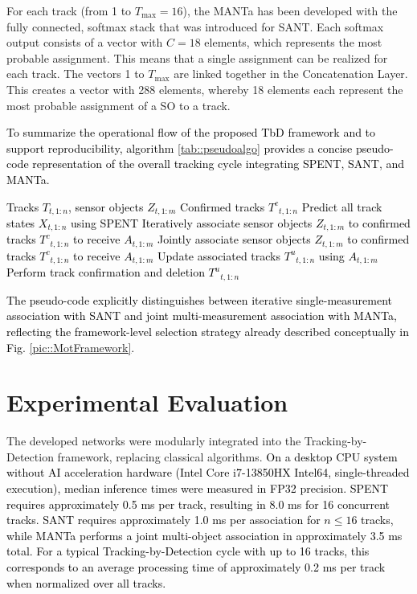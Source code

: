 \documentclass[letterpaper, 10 pt, journal, twoside]{IEEEtran}
\newcommand{\red}[1]{\textcolor{black}{#1}}
\begin{document}
For each track (from 1 to $T_{\max}=16$), the MANTa has been developed with the fully connected, softmax stack that was introduced for \ac{SANT}.
Each softmax output consists of a vector with $C=18$ elements, which represents the most probable assignment.
This means that a single assignment can be realized for each track.
The vectors 1 to $T_{\max}$ are linked together in the Concatenation Layer.
This creates a vector with 288 elements, whereby 18 elements each represent the most probable assignment of a \ac{SO} to a track.

\red{To summarize the operational flow of the proposed \ac{TbD} framework and to support reproducibility, algorithm {\ref{tab::pseudoalgo}} provides a concise pseudo-code representation of the overall tracking cycle integrating \ac{SPENT}, \ac{SANT}, and \ac{MANTa}.}

\begin{algorithm}[h]
    \caption{\red{Tracking-by-Detection Cycle with SPENT, SANT, and MANTa}}
    \label{tab::pseudoalgo}
    \begin{algorithmic}[1]
        \REQUIRE \red{Tracks ${T}_{t,1:n}$, sensor objects ${Z}_{t,1:m}$}
        \ENSURE \red{Confirmed tracks ${T^c}_{t,1:n}$}
        \STATE \red{Predict all track states ${X}_{t,1:n}$ using SPENT}
            \IF{\red{SANT is used}}
                \STATE \red{Iteratively associate sensor objects ${Z}_{t,1:m}$ to confirmed tracks ${T^c}_{t,1:n}$ to receive ${A}_{t,1:m}$}
            \ELSIF{\red{MANTa is used}}
                \STATE \red{Jointly associate sensor objects ${Z}_{t,1:m}$ to confirmed tracks ${T^c}_{t,1:n}$ to receive ${A}_{t,1:m}$}
            \ENDIF
        \STATE \red{Update associated tracks ${T^u}_{t,1:n}$ using ${A}_{t,1:m}$}
        \STATE \red{Perform track confirmation and deletion}
        \RETURN \red{${T^u}_{t,1:n}$}
    \end{algorithmic}
\end{algorithm}

\red{The pseudo-code explicitly distinguishes between iterative single-measurement association with \ac{SANT} and joint multi-measurement association with \ac{MANTa}, reflecting the framework-level selection strategy already described conceptually in Fig. {\ref{pic::MotFramework}}.}

\section{Experimental Evaluation}
The developed networks were modularly integrated into the Tracking-by-Detection framework, replacing classical algorithms.
\red{On a desktop CPU system without AI acceleration hardware (Intel Core i7-13850HX Intel64, single-threaded execution),
median inference times were measured in FP32 precision.
SPENT requires approximately 0.5 ms per track, resulting in 8.0 ms for 16 concurrent tracks.
SANT requires approximately 1.0 ms per association for $n\leq16$ tracks, while MANTa performs a joint multi-object association in approximately 3.5 ms total. For a typical Tracking-by-Detection cycle with up to 16 tracks, this corresponds to an average processing time of approximately 0.2 ms per track when normalized over all tracks.}
\end{document}
